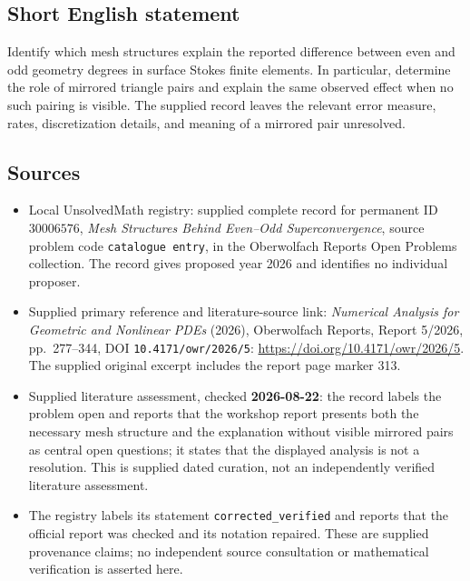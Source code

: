 \documentclass[11pt]{article}
\begin{document}
\subsection{Short English statement}
Identify which mesh structures explain the reported difference between even and odd geometry degrees in surface Stokes finite elements. In particular, determine the role of mirrored triangle pairs and explain the same observed effect when no such pairing is visible. The supplied record leaves the relevant error measure, rates, discretization details, and meaning of a mirrored pair unresolved.
\subsection{Sources}
\begin{itemize}
\item Local UnsolvedMath registry: supplied complete record for permanent ID \(30006576\), \emph{Mesh Structures Behind Even--Odd Superconvergence}, source problem code \texttt{catalogue entry}, in the Oberwolfach Reports Open Problems collection. The record gives proposed year 2026 and identifies no individual proposer.
\item Supplied primary reference and literature-source link: \emph{Numerical Analysis for Geometric and Nonlinear PDEs} (2026), Oberwolfach Reports, Report 5/2026, pp.\ 277--344, DOI \texttt{10.4171/owr/2026/5}: \url{https://doi.org/10.4171/owr/2026/5}. The supplied original excerpt includes the report page marker 313.
\item Supplied literature assessment, checked \textbf{2026-08-22}: the record labels the problem open and reports that the workshop report presents both the necessary mesh structure and the explanation without visible mirrored pairs as central open questions; it states that the displayed analysis is not a resolution. This is supplied dated curation, not an independently verified literature assessment.
\item The registry labels its statement \texttt{corrected\_verified} and reports that the official report was checked and its notation repaired. These are supplied provenance claims; no independent source consultation or mathematical verification is asserted here.
\end{itemize}
\end{document}
